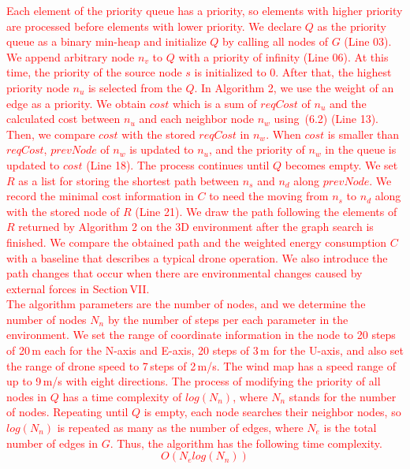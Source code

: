 \documentclass[onecolumn]{IEEEconf}
\begin{document}
\begin{description}
\begin{mdframed} [linewidth=.75pt, userdefinedwidth=0.9\textwidth]
    \textcolor{red}{Each element of the priority queue has a priority, so elements with higher priority are processed before elements with lower priority.
    We declare $Q$ as the priority queue as a binary min-heap and initialize $Q$ by calling all nodes of $G$ (Line 03).
    We append arbitrary node $n_v$ to $Q$ with a priority of infinity (Line 06). 
    At this time, the priority of the source node $s$ is initialized to 0.
    After that, the highest priority node $n_u$ is selected from the $Q$. 
    In Algorithm 2, we use the weight of an edge as a priority.
    We obtain $cost$ which is a sum of $reqCost$ of $n_u$ and the calculated cost between $n_u$ and each neighbor node $n_w$ using~(6.2) (Line 13). 
    Then, we compare $cost$ with the stored $reqCost$ in $n_w$.
    When $cost$ is smaller than $reqCost$, $prevNode$ of $n_w$ is updated to $n_u$, and the priority of $n_w$ in the queue is updated to $cost$ (Line 18).
    The process continues until $Q$ becomes empty.
    We set $R$ as a list for storing the shortest path between $n_s$ and $n_d$ along $prevNode$.
    We record the minimal cost information in $C$ to need the moving from $n_s$ to $n_d$ along with the stored node of $R$ (Line 21).
    We draw the path following the elements of $R$ returned by Algorithm 2 on the 3D environment after the graph search is finished.
    We compare the obtained path and the weighted energy consumption $C$ with a baseline that describes a typical drone operation. 
    We also introduce the path changes that occur when there are environmental changes caused by external forces in Section\,VII.}   
    ~\\
    \textcolor{red}{
    The algorithm parameters are the number of nodes, and we determine the number of nodes $N_n$ by the number of steps per each parameter in the environment.  
    We set the range of coordinate information in the node to 20 steps of 20\,m each for the N-axis and E-axis, 20 steps of 3\,m for the U-axis, and also set the range of drone speed to 7\,steps of 2\,m/s. 
    The wind map has a speed range of up to 9\,m/s with eight directions.
    The process of modifying the priority of all nodes in $Q$ has a time complexity of $log(N_n)$, where $N_n$ stands for the number of nodes.
    Repeating until $Q$ is empty, each node searches their neighbor nodes, so $log(N_n)$ is repeated as many as the number of edges, where $N_e$ is the total number of edges in $G$. 
    Thus, the algorithm has the following time complexity.
    \begin{equation*}
    O(N_elog(N_n)) \tag{6.3} \label{eq:complexity}

\end{equation*}}
\end{mdframed}
\end{description}
\end{document}

